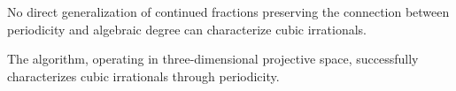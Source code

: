 \begin{corollary}\label{cor:cf_insufficient}
No direct generalization of continued fractions preserving the connection between periodicity and algebraic degree can characterize cubic irrationals.
\end{corollary}

The \HAPD{} algorithm, operating in three-dimensional projective space, successfully characterizes cubic irrationals through periodicity.
